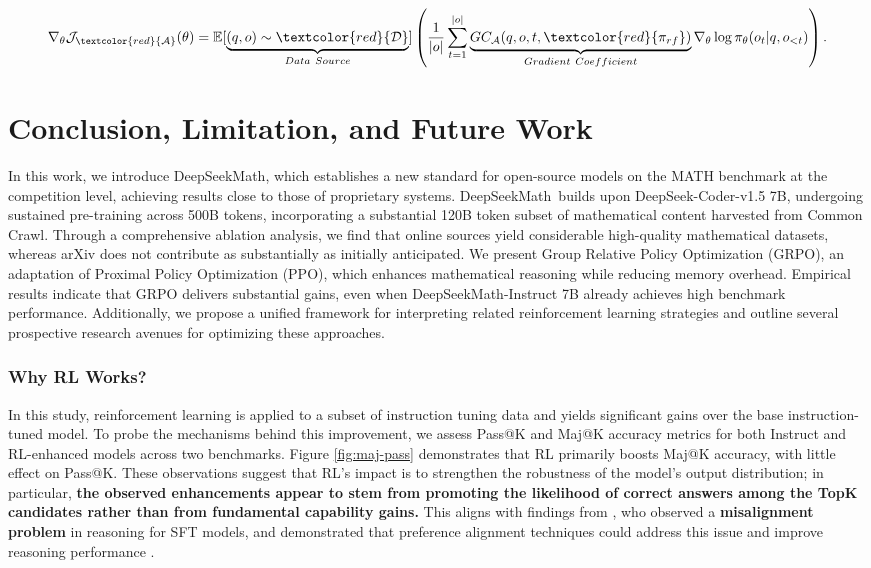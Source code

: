 \begin{equation}
    \nabla_{\theta}\mathcal{J}_{\textcolor{red}{\mathcal{A}}}(\theta) = \mathbb{E}[\underbrace{(q,o) \sim \textcolor{red}{\mathcal{D}}}_{Data \ Source}]\left( \frac{1}{|o|} \sum_{t=1}^{|o|}  \underbrace{GC_{{\mathcal{A}}}(q, o, t, \textcolor{red}{\pi_{{rf}}})}_{Gradient \ Coefficient}  \nabla_{\theta}\log \pi_{\theta}(o_t | q, o_{<t})\right).
\label{eq:objective}
\end{equation}

\section{Conclusion, Limitation, and Future Work} In this work, we introduce DeepSeekMath, which establishes a new standard for open-source models on the MATH benchmark at the competition level, achieving results close to those of proprietary systems. DeepSeekMath~builds upon DeepSeek-Coder-v1.5 7B, undergoing sustained pre-training across 500B tokens, incorporating a substantial 120B token subset of mathematical content harvested from Common Crawl. Through a comprehensive ablation analysis, we find that online sources yield considerable high-quality mathematical datasets, whereas arXiv does not contribute as substantially as initially anticipated. We present Group Relative Policy Optimization (GRPO), an adaptation of Proximal Policy Optimization (PPO), which enhances mathematical reasoning while reducing memory overhead. Empirical results indicate that GRPO delivers substantial gains, even when DeepSeekMath-Instruct 7B already achieves high benchmark performance. Additionally, we propose a unified framework for interpreting related reinforcement learning strategies and outline several prospective research avenues for optimizing these approaches.

\subsubsection{Why RL Works?} In this study, reinforcement learning is applied to a subset of instruction tuning data and yields significant gains over the base instruction-tuned model. To probe the mechanisms behind this improvement, we assess Pass@K and Maj@K accuracy metrics for both Instruct and RL-enhanced models across two benchmarks. Figure \ref{fig:maj-pass} demonstrates that RL primarily boosts Maj@K accuracy, with little effect on Pass@K. These observations suggest that RL's impact is to strengthen the robustness of the model's output distribution; in particular, \textbf{the observed enhancements appear to stem from promoting the likelihood of correct answers among the TopK candidates rather than from fundamental capability gains.} This aligns with findings from \citep{wang2023making}, who observed a \textbf{misalignment problem} in reasoning for SFT models, and demonstrated that preference alignment techniques could address this issue and improve reasoning performance \citep{yuan2023rrhf,song2023preference,wang2023making}.

